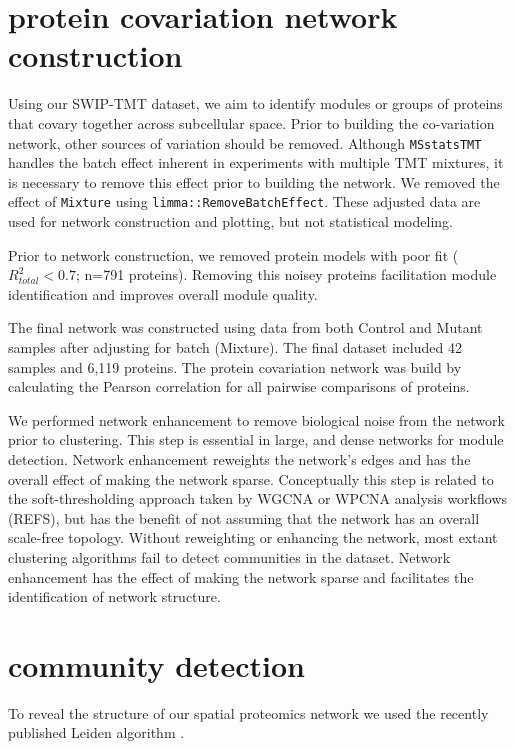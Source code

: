 \documentclass[11pt]{elife}\usepackage[]{graphicx}\usepackage[]{color}
\begin{document}
\section{protein covariation network construction}

Using our SWIP-TMT dataset, we aim to identify modules or groups of
proteins that covary together across subcellular space. Prior to building the
co-variation network, other sources of variation should be removed. Although
\texttt{MSstatsTMT} handles the batch effect inherent in experiments with
multiple TMT mixtures, it is necessary to remove this effect prior to building
the network. We removed the effect of \texttt{Mixture} using
\texttt{limma::RemoveBatchEffect}. These adjusted data are used for network
construction and plotting, but not statistical modeling.

Prior to network construction, we removed protein models with poor fit 
($R^2_{total}<0.7$; n=791 proteins). Removing this noisey proteins facilitation
module identification and improves overall module quality.

The final network was constructed using data from both Control and Mutant 
samples after adjusting for batch (Mixture). The final dataset included 
42 samples and 6,119 proteins. The protein covariation network was build by
calculating the Pearson correlation for all pairwise comparisons of proteins.

We performed network enhancement to remove biological noise from the network
prior to clustering. This step is essential in large, and dense networks for
module detection. Network enhancement reweights the
network's edges and has the overall effect of making the network sparse.
Conceptually this step is related to the soft-thresholding approach taken by
WGCNA or WPCNA analysis workflows (REFS), but has the benefit of not assuming
that the network has an overall scale-free topology.  Without reweighting or
enhancing the network, most extant clustering algorithms fail to detect
communities in the dataset.  Network enhancement has the effect of making the
network sparse and facilitates the identification of network structure.\\

\section{community detection}

To reveal the structure of our spatial proteomics network we used the recently
published Leiden algorithm \citep{Traag2019}.
\end{document}
